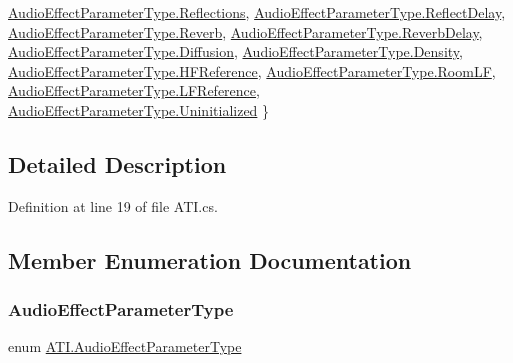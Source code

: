 \begin{DoxyCompactItemize}
\hyperlink{class_a_t_i_a1123d61b8dceb5867a3683e8d2224ee1aa6b0c7b1660b8bcf855575f7438b7327}{Audio\+Effect\+Parameter\+Type.\+Reflections}, 
\hyperlink{class_a_t_i_a1123d61b8dceb5867a3683e8d2224ee1a3b5ed2d0572fe00ea5d0cf9bf7a5d7cd}{Audio\+Effect\+Parameter\+Type.\+Reflect\+Delay}, 
\hyperlink{class_a_t_i_a1123d61b8dceb5867a3683e8d2224ee1a3e90790c668535d048f76550a04adb64}{Audio\+Effect\+Parameter\+Type.\+Reverb}, 
\newline
\hyperlink{class_a_t_i_a1123d61b8dceb5867a3683e8d2224ee1a7489e4b8f6eb56ca34053cd2c9389322}{Audio\+Effect\+Parameter\+Type.\+Reverb\+Delay}, 
\hyperlink{class_a_t_i_a1123d61b8dceb5867a3683e8d2224ee1ac9fc4714730359980e89007f327c5b7d}{Audio\+Effect\+Parameter\+Type.\+Diffusion}, 
\hyperlink{class_a_t_i_a1123d61b8dceb5867a3683e8d2224ee1a7e6d11dd9dbeef53c1cb3cb896bce476}{Audio\+Effect\+Parameter\+Type.\+Density}, 
\hyperlink{class_a_t_i_a1123d61b8dceb5867a3683e8d2224ee1a03f695bbc868ba7dd60b15ebcb91d48a}{Audio\+Effect\+Parameter\+Type.\+H\+F\+Reference}, 
\hyperlink{class_a_t_i_a1123d61b8dceb5867a3683e8d2224ee1a7f4da92ded0205f86489d8f2bdb5b0cb}{Audio\+Effect\+Parameter\+Type.\+Room\+LF}, 
\hyperlink{class_a_t_i_a1123d61b8dceb5867a3683e8d2224ee1ad50037cb2476699f6f1c9d6a4a311656}{Audio\+Effect\+Parameter\+Type.\+L\+F\+Reference}, 
\hyperlink{class_a_t_i_a1123d61b8dceb5867a3683e8d2224ee1af704f57ea420275ad51bf55b7dec2c96}{Audio\+Effect\+Parameter\+Type.\+Uninitialized}
 \}
\end{DoxyCompactItemize}


\subsection{Detailed Description}


Definition at line 19 of file A\+T\+I.\+cs.



\subsection{Member Enumeration Documentation}
\mbox{\label{class_a_t_i_a1123d61b8dceb5867a3683e8d2224ee1}} 
\subsubsection{\texorpdfstring{Audio\+Effect\+Parameter\+Type}{AudioEffectParameterType}}
{\footnotesize\ttfamily enum \hyperlink{class_a_t_i_a1123d61b8dceb5867a3683e8d2224ee1}{A\+T\+I.\+Audio\+Effect\+Parameter\+Type}\hspace{0.3cm}{\ttfamily [strong]}}

